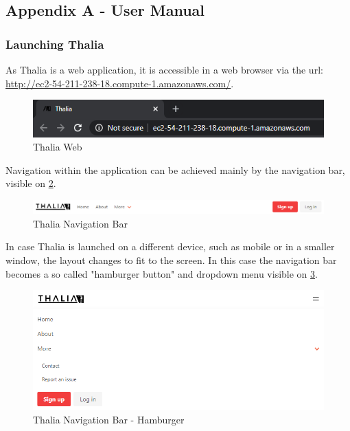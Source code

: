\documentclass[main.tex]{subfiles}
\begin{document}
\subsection{Appendix A - User Manual}
\label{user_manual}
\subsubsection{Launching Thalia}
As Thalia is a web application, it is accessible in a web browser via the url: \url{http://ec2-54-211-238-18.compute-1.amazonaws.com/}.

\begin{figure}[H]
   \centering
   \includegraphics[scale=0.8]{08Appendices/081User/081Pictures/thalia_domain.png}
   \caption{Thalia Web}
   \label{thalia_web}
\end{figure}

Navigation within the application can be achieved mainly by the navigation bar, visible on \figurename{\ref{thalia_navbar}}.

\begin{figure}[H]
   \centering
   \includegraphics[width=\textwidth]{08Appendices/081User/081Pictures/navbar.png}
   \caption{Thalia Navigation Bar}
   \label{thalia_navbar}
\end{figure}

In case Thalia is launched on a different device, such as mobile or in a smaller window, the layout changes to fit to the screen. In this case the navigation bar becomes a so called "hamburger button" and dropdown menu visible on \figurename{\ref{thalia_navbar_hamburger}}.

\begin{figure}[H]
   \centering
   \includegraphics[width=\textwidth]{08Appendices/081User/081Pictures/navbar_hamburger.png}
   \caption{Thalia Navigation Bar - Hamburger}
   \label{thalia_navbar_hamburger}
\end{figure}
\end{document}

